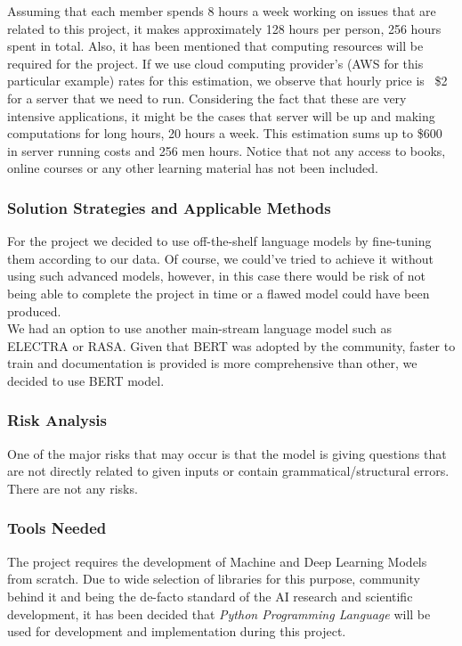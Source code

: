 \documentclass{mefsdp}
\begin{document}
	Assuming that each member spends 8 hours a week working on issues that are related to this project, it makes approximately 128 hours per person, 256 hours spent in total. Also, it has been mentioned that computing resources will be required for the project. If we use cloud computing provider’s (AWS for this particular example) rates for this estimation, we observe that hourly price is ~\$2 for a server that we need to run. Considering the fact that these are very intensive applications, it might be the cases that server will be up and making computations for long hours, 20 hours a week. This estimation sums up to \$600 in server running costs and 256 men hours. Notice that not any access to books, online courses or any other learning material has not been included.
	
	
	\subsubsection{Solution Strategies and Applicable Methods}
	For the project we decided to use off-the-shelf language models by fine-tuning them according to our data. Of course, we could’ve tried to achieve it without using such advanced models, however, in this case there would be risk of not being able to complete the project in time or a flawed model could have been produced.\\
	
	We had an option to use another main-stream language model such as ELECTRA or RASA. Given that BERT was adopted by the community, faster to train and documentation is provided is more comprehensive than other, we decided to use BERT model.
	
	
	\subsubsection{Risk Analysis}
	One of the major risks that may occur is that the model is giving questions that are not directly related to given inputs or contain grammatical/structural errors. There are not any risks.
	
	\subsubsection{Tools Needed}
	The project requires the development of Machine and Deep Learning Models from scratch. Due to wide selection of libraries for this purpose, community behind it and being the de-facto standard of the AI research and scientific development, it has been decided that \textit{Python Programming Language} will be used for development and implementation during this project.\\
	
\end{document}
